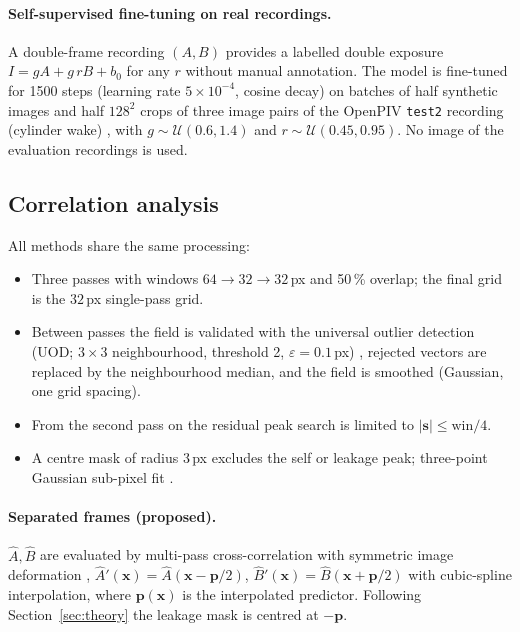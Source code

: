 \documentclass[11pt]{article}
\theoremstyle{remark}
\newcommand{\x}{\mathbf{x}}
\newcommand{\s}{\mathbf{s}}
\newcommand{\p}{\mathbf{p}}
\begin{document}
\paragraph{Self-supervised fine-tuning on real recordings.}
A double-frame recording $(A,B)$ provides a labelled double exposure $I=gA+g\,rB+b_0$ for any $r$ without manual annotation.
The model is fine-tuned for 1500 steps (learning rate $5\times10^{-4}$, cosine decay) on batches of half synthetic images and half $128^2$ crops of three image pairs of the OpenPIV \texttt{test2} recording (cylinder wake) \citep{openpiv}, with $g\sim\mathcal U(0.6,1.4)$ and $r\sim\mathcal U(0.45,0.95)$.
No image of the evaluation recordings is used.

\subsection{Correlation analysis}
All methods share the same processing:
\begin{itemize}
\item Three passes with windows $64\to32\to32$\,px and 50\,\% overlap; the final grid is the $32$\,px single-pass grid.
\item Between passes the field is validated with the universal outlier detection (UOD; $3\times3$ neighbourhood, threshold 2, $\varepsilon=0.1$\,px) \citep{westerweel2005}, rejected vectors are replaced by the neighbourhood median, and the field is smoothed (Gaussian, one grid spacing).
\item From the second pass on the residual peak search is limited to $|\s|\le\mathrm{win}/4$.
\item A centre mask of radius 3\,px excludes the self or leakage peak; three-point Gaussian sub-pixel fit \citep{willert1991}.
\end{itemize}

\paragraph{Separated frames (proposed).}
$\hat A,\hat B$ are evaluated by multi-pass cross-correlation with symmetric image deformation \citep{scarano2002}, $\hat A'(\x)=\hat A(\x-\p/2)$, $\hat B'(\x)=\hat B(\x+\p/2)$ with cubic-spline interpolation, where $\p(\x)$ is the interpolated predictor. Following Section~\ref{sec:theory} the leakage mask is centred at $-\p$.
\end{document}

